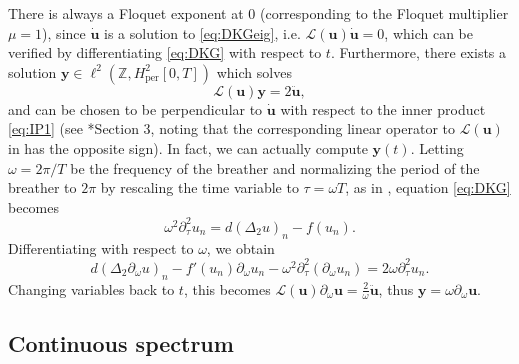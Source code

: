 \documentclass[12pt,reqno]{amsart}
\def\Z{{\mathbb Z}}
\def\per{\textrm{per}}
\def\calL{\mathcal{L}}
\newcommand{\uvec}{\mathbf{u}}
\newcommand{\yvec}{\mathbf{y}}
\theoremstyle{definition}
\begin{document}
There is always a Floquet exponent at 0 (corresponding to the Floquet multiplier $\mu = 1$), since $\dot{\uvec}$ is a solution to \cref{eq:DKGeig}, i.e. $\calL(\uvec)\dot{\uvec} = 0$, which can be verified by differentiating \cref{eq:DKG} with respect to $t$. Furthermore, there exists a solution $\yvec \in \ell^2(\Z, H^2_\per[0,T])$ which solves 
\begin{equation}
\calL(\uvec)\yvec = 2 \ddot{\uvec},
\end{equation}
and can be chosen to be perpendicular to $\dot{\uvec}$ with respect to the inner product \cref{eq:IP1} (see \cite{Pelinovsky2012}*{Section 3}, noting that the corresponding linear operator to $\calL(\uvec)$ in \cite{Pelinovsky2012} has the opposite sign). In fact, we can actually compute $\yvec(t)$. 
Letting $\omega = 2 \pi / T$ be the frequency of the breather and normalizing the period of the breather to $2 \pi$ by rescaling the time variable to $\tau = \omega T$, as in \cite{kevrekidis2016}, equation \cref{eq:DKG} becomes
\begin{equation}\label{eq:DKGomega}
\omega^2 \partial_\tau^2 u_n = d (\Delta_2 u)_n - f(u_n).
\end{equation}
Differentiating with respect to $\omega$, we obtain
\begin{equation}\label{eq:DKGdiffw}
d (\Delta_2 \partial_\omega u)_n - f'(u_n)\partial_\omega u_n 
- \omega^2 \partial_\tau^2 ( \partial_\omega u_n) = 2 \omega \partial_\tau^2 u_n.
\end{equation}
Changing variables back to $t$, this becomes $\calL(\uvec)\partial_\omega \uvec = \frac{2}\omega \ddot{\uvec}$, thus $\yvec = \omega \partial_\omega \uvec$.

\subsection{Continuous spectrum}
\end{document}

